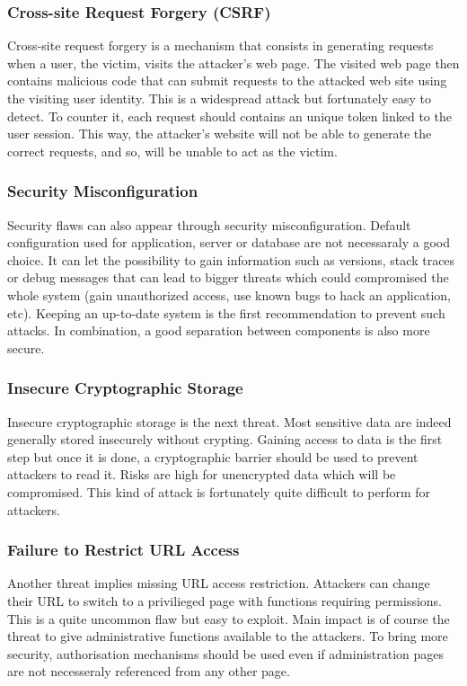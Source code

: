 \subsubsection{Cross-site Request Forgery (CSRF)}
Cross-site request forgery is a mechanism that consists in generating requests
when a user, the victim, visits the attacker's web page. The visited web page
then contains malicious code that can submit requests to the attacked web site
using the visiting user identity. This is a widespread attack but fortunately
easy to detect. To counter it, each request should contains an unique token
linked to the user session. This way, the attacker's website will not be able
to generate the correct requests, and so, will be unable to act as the victim.

\subsubsection{Security Misconfiguration}
Security flaws can also appear through security misconfiguration. Default
configuration used for application, server or database are not necessaraly a
good choice. It can let the possibility to gain information such as versions,
stack traces or debug messages that can lead to bigger threats which could
compromised the whole system (gain unauthorized access, use known bugs to hack
an application, etc). Keeping an up-to-date system is the first recommendation
to prevent such attacks. In combination, a good separation between components
is also more secure.

\subsubsection{Insecure Cryptographic Storage}
Insecure cryptographic storage is the next threat. Most sensitive data are
indeed generally stored insecurely without crypting. Gaining access to data is
the first step but once it is done, a cryptographic barrier should be used to
prevent attackers to read it. Risks are high for unencrypted data which will
be compromised. This kind of attack is fortunately quite difficult to perform
for attackers.

\subsubsection{Failure to Restrict URL Access}
Another threat implies missing URL access restriction. Attackers can change
their URL to switch to a privilieged page with functions requiring
permissions. This is a quite uncommon flaw but easy to exploit. Main impact is
of course the threat to give administrative functions available to the
attackers. To bring more security, authorisation mechanisms should be used
even if administration pages are not necesseraly referenced from any other
page.

